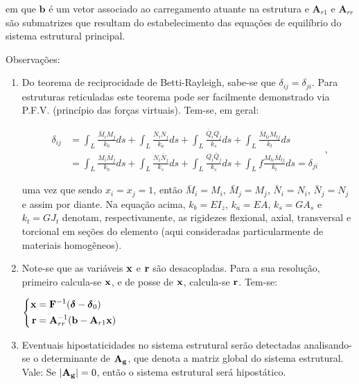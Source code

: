 \noindent em que \(\textbf{b}\) é um vetor associado ao carregamento atuante na estrutura e \(\mathbf{A}_{r1}\) e \(\mathbf{A}_{rr}\) são submatrizes que resultam do estabelecimento das equações de equilíbrio do sistema estrutural principal.

\newpage

Observações:
\begin{enumerate}
	\item
	      Do teorema de reciprocidade de Betti-Rayleigh, sabe-se que \(\delta_{ij}=\delta_{ji}\). Para estruturas reticuladas este teorema pode ser facilmente demonstrado via P.F.V. (princípio das forças virtuais). Tem-se, em geral:

	      \bigskip

	      \[
		      \begin{aligned}
			      \delta_{ij}
			       & =
			      \int_{L}\frac{\bar{M}_iM_j}{k_b}ds
			      +\int_{L}\frac{\bar{N}_iN_j}{k_a}ds
			      +\int_{L} \frac{\bar{Q}_iQ_j}{k_s}ds
			      +\int_{L}\frac{\bar{M}_{ti}M_{tj}}{k_t}ds \\ & =
			      \int_{L}\frac{M_i\bar{M}_j}{k_b}ds
			      +\int_{L}\frac{N_i\bar{N}_j}{k_s}ds
			      +\int_{L}\frac{Q_i\bar{Q}_j}{k_s}ds
			      +\int_{L}f
			      \frac{M_{ti}\bar{M}_{tj}}{k_t}ds
			      =
			      \delta_{ji}
		      \end{aligned} \; ,
	      \]

	      \bigskip

	      \noindent uma vez que sendo \(x_i=x_j=1\), então \(\bar{M}_i=M_i\), \(\bar{M}_j=M_j\), \(\bar{N}_i=N_i\), \(\bar{N}_j=N_j\) e assim por diante. Na equação acima, \(k_b=EI_z\), \(k_a=EA\), \(k_s=GA_s\) e \(k_t=GJ_t\) denotam, respectivamente, as rigidezes flexional, axial, transversal e torcional em seções do elemento (aqui consideradas particularmente de materiais homogêneos).\

	\item
	      Note-se que as variáveis \(\bf{x}\) e \(\bf{r}\) são desacopladas. Para a sua resolução, primeiro calcula-se \(\bf{x}\), e de posse de \(\bf{x}\), calcula-se \(\bf{r}\). Tem-se:

	      \bigskip

	      \(\left\{\begin{aligned}
		      \mathbf{x} & =\mathbf{F}^{-1}(\boldsymbol{\delta}-\boldsymbol{\delta}_0) \\
		      \mathbf{r} & =\mathbf{A}_{rr}^{-1}(\mathbf{b}-\mathbf{A}_{r1}\bf{x})
	      \end{aligned}\right.\)

	      \bigskip

	\item
	      Eventuais hipostaticidades no sistema estrutural serão detectadas analisando-se o determinante de \(\bf{A}_g\), que denota a matriz global do sistema estrutural. Vale:
	      Se \(\left |\bf{A}_g  \right |=0\), então o sistema estrutural será hipostático.
\end{enumerate}

